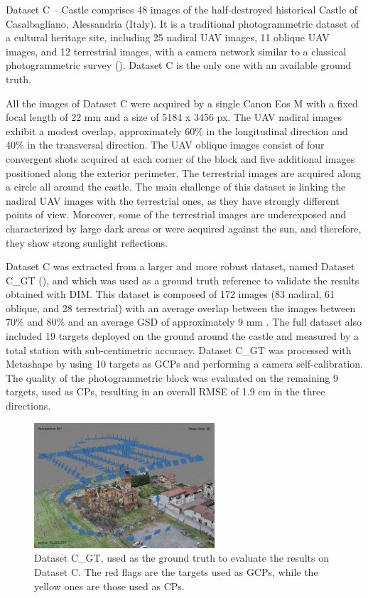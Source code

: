 Dataset C – Castle comprises 48 images of the half-destroyed historical Castle of Casalbagliano, Alessandria (Italy). 
It is a traditional photogrammetric dataset of a cultural heritage site, including 25 nadiral UAV images, 11 oblique UAV images, and 12 terrestrial images, with a camera network similar to a classical photogrammetric survey (). Dataset C is the only one with an available ground truth. 

All the images of Dataset C were acquired by a single Canon Eos M with a fixed focal length of 22 mm and a size of 5184 x 3456 px.
The UAV nadiral images exhibit a modest overlap, approximately 60\% in the longitudinal direction and 40\% in the transversal direction. 
The UAV oblique images consist of four convergent shots acquired at each corner of the block and five additional images positioned along the exterior perimeter. 
The terrestrial images are acquired along a circle all around the castle. 
The main challenge of this dataset is linking the nadiral UAV images with the terrestrial ones, as they have strongly different points of view. 
Moreover, some of the terrestrial images are underexposed and characterized by large dark areas or were acquired against the sun, and therefore, they show strong sunlight reflections. 

Dataset C was extracted from a larger and more robust dataset, named Dataset C\_GT (), and which was used as a ground truth reference to validate the results obtained with DIM.
This dataset is composed of 172 images (83 nadiral, 61 oblique, and 28 terrestrial) with an average overlap between the images between 70\% and 80\% and an average GSD of approximately 9 mm \cite{Gagliolo2017_uav_conservation_histo, gagliolo2018_parameter_optim}. 
The full dataset also included 19 targets deployed on the ground around the castle and measured by a total station with sub-centimetric accuracy. 
Dataset C\_GT was processed with Metashape by using 10 targets as GCPs and performing a camera self-calibration. 
The quality of the photogrammetric block was evaluated on the remaining 9 targets, used as CPs, resulting in an overall RMSE of 1.9 cm in the three directions.


\begin{figure}
  \centering
    \includegraphics[width=0.6\textwidth]{castle_gt}
  \caption{Dataset C\_GT, used as the ground truth to evaluate the results on Dataset C. The red flags are the targets used as GCPs, while the yellow ones are those used as CPs.}
  \label{fig:5:castle_gt}
\end{figure}


